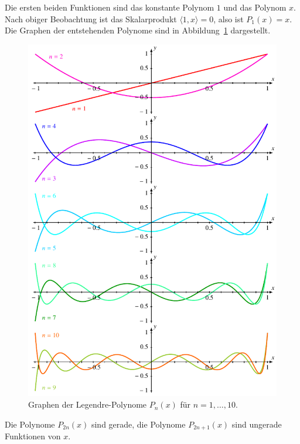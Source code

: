 Die ersten beiden Funktionen sind das konstante Polynom $1$ und
das Polynom $x$.
Nach obiger Beobachtung ist das Skalarprodukt $\langle 1,x\rangle=0$,
also ist $P_1(x)=x$.
Die Graphen der entstehenden Polynome sind in
Abbildung~\ref{buch:integral:orthogonal:legendregraphen}
dargestellt.
\begin{figure}
\centering
\includegraphics{chapters/070-orthogonalitaet/images/legendre.pdf}
\caption{Graphen der Legendre-Polynome $P_n(x)$ für $n=1,\dots,10$.
\label{buch:integral:orthogonal:legendregraphen}}
\end{figure}

\begin{lemma}
\label{buch:orthogonal:lemma:symmetrie}
Die Polynome $P_{2n}(x)$ sind gerade, die Polynome $P_{2n+1}(x)$ sind
ungerade Funktionen von $x$.
\end{lemma}

